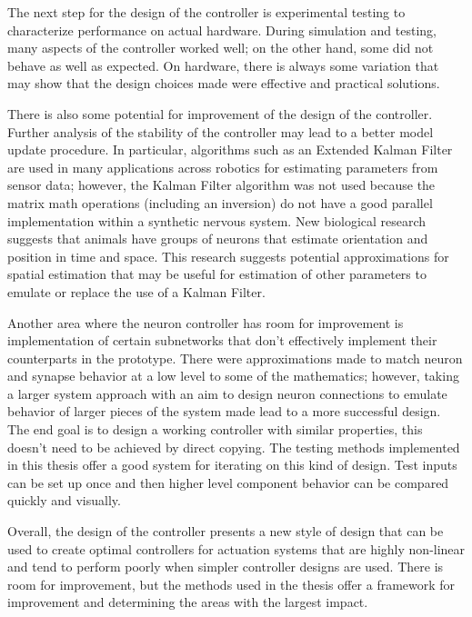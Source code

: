 The next step for the design of the controller is experimental testing to
characterize performance on actual hardware. During simulation and testing,
many aspects of the controller worked well; on the other hand, some did not
behave as well as expected. On hardware, there is always some variation that may
show that the design choices made were effective and practical solutions.

There is also some potential for improvement of the design of the controller.
Further analysis of the stability of the controller may lead to a better model
update procedure. In particular, algorithms such as an Extended Kalman Filter
are used in many applications across robotics for estimating parameters from
sensor data; however, the Kalman Filter algorithm was not used because the matrix math operations (including an inversion) do
not have a good parallel implementation within a synthetic nervous system.
New biological research %
suggests that animals have groups of neurons that estimate orientation and
position in time and space. This research suggests potential approximations for
spatial estimation that may be useful for estimation of other parameters to
emulate or replace the use of a Kalman Filter.

Another area where the neuron controller has room for improvement is
implementation of certain subnetworks that don't effectively implement their
counterparts in the prototype. There were approximations made to match neuron
and synapse behavior at a low level to some of the mathematics; however, taking
a larger system approach with an aim to design neuron connections to emulate
behavior of larger pieces of the system made lead to a more successful design.
The end goal is to design a working controller with similar properties, this
doesn't need to be achieved by direct copying. The testing methods implemented
in this thesis offer a good system for iterating on this kind of design. Test
inputs can be set up once and then higher level component behavior can be
compared quickly and visually.

Overall, the design of the controller presents a new style of design that can be
used to create optimal controllers for actuation systems that are highly
non-linear and tend to perform poorly when simpler controller designs are used.
There is room for improvement, but the methods used in the thesis offer a
framework for improvement and determining the areas with the largest impact.
